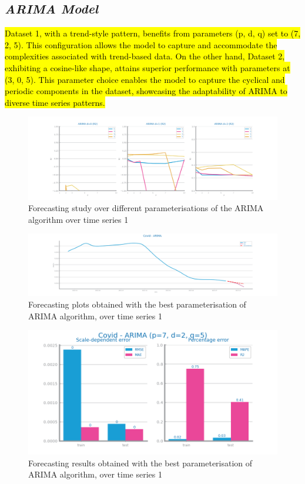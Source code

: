 \documentclass[10pt]{extarticle}
\newcommand{\ctext}[3][RGB]{%
  \begingroup
  \definecolor{hlcolor}{#1}{#2}\sethlcolor{hlcolor}%
  \hl{#3}%
  \endgroup
}
\begin{document}
\subsection*{\textit{ARIMA Model}}
\ctext[RGB]{190,190,190}{Dataset 1, with a trend-style pattern, benefits from parameters (p, d, q) set to (7, 2, 5). This configuration allows the model to capture and accommodate the complexities associated with trend-based data. On the other hand, Dataset 2, exhibiting a cosine-like shape, attains superior performance with parameters at (3, 0, 5). This parameter choice enables the model to capture the cyclical and periodic components in the dataset, showcasing the adaptability of ARIMA to diverse time series patterns.}

\begin{figure}[H]
\centering\includegraphics[scale=0.4]{images/dataset1/time_series/Covid_arima_R2_study.png}
\caption{Forecasting study over different parameterisations of the ARIMA algorithm over time series 1}
\end{figure}

\begin{figure}[H]
\centering\includegraphics[scale=0.4]{images/dataset1/time_series/Covid - ARIMA _forecasting_series.png}
\caption{Forecasting plots obtained with the best parameterisation of ARIMA algorithm, over time series 1}
\end{figure}

\begin{figure}[H]
\centering\includegraphics[scale=0.5]{images/dataset1/time_series/Covid - ARIMA (p=7, d=2, q=5)_forecasting_eval.png}
\caption{Forecasting results obtained with the best parameterisation of ARIMA algorithm, over time series 1}
\end{figure}
\end{document}
